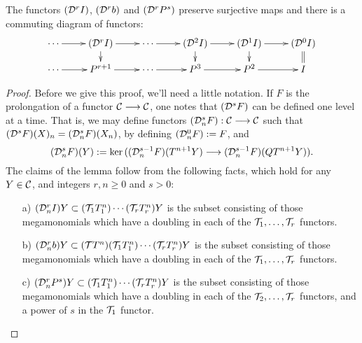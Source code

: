 \documentclass[10pt]{article}
\newcommand{\caldup}[1]{\calD^{\smash{#1}}}
\newcommand{\caldupdown}[2]{\calD^{\smash{#1}}_{\smash{#2}}}
\newcommand{\Comm}{\calC}
\begin{document}
\begin{convergence}
%
\begin{lem}\label{towerWithPowers}
The functors $(\caldup{r}I)$, $(\caldup{r}b)$ and $(\caldup{r}P^{s})$ preserve surjective maps and there is a commuting diagram of functors:
\[\xymatrix@R=4mm{
\cdots 
\ar[r]
&%
(\caldup{r}I)
\ar[r]
\ar[d]
&%
\cdots \ar[r]
&%
(\caldup{2}I)
\ar[r]
\ar[d]
&%
(\caldup{1}I)
\ar[r]
\ar[d]&%
(\caldup{0}I)
\ar@{=}[d]
\\%
\cdots
\ar[r]
&%
P^{r+1}
\ar[r]
&%
\cdots 
\ar[r]&%
P^3
\ar[r]
&P^2
\ar[r]
&%
I%
}\]
\end{lem}
\begin{proof}
Before we give this proof, we'll need a little notation.
If $F$ is the prolongation of a functor $\Comm\to\Comm$, one notes that $(\caldup{s}F)$ can be defined one level at a time. That is,  we may define functors $(\caldupdown{s}{n}F):\Comm\to\Comm$ such that $(\caldup{s}F)(X)_n=(\caldupdown{s}{n}F)(X_n)$, by defining $(\caldupdown{0}{n}F):=F$, and
\[(\caldupdown{s}{n}F)(Y):=\ker((\caldupdown{s-1}{n}F)(T^{n+1}Y)\to (\caldupdown{s-1}{n}F)(QT^{n+1}Y)).\]
The claims of the lemma follow from the following facts, which hold for any $Y\in\Comm$, and integers $r,n\geq0$ and $s>0$:
\begin{enumerate}
\squishlist
\setlength{\parindent}{.25in}
\item[a)] $(\caldupdown{r}{n}I)Y\subset (\calT_1T^n_1)\cdots (\calT_rT^n_r)Y$ is the subset consisting of those mega\-monomials which have a doubling in each of the $\mathcal{T}_1,\ldots,\mathcal{T}_r$ functors.
\item[b)] $(\caldupdown{r}{n}b)Y\subset (\calT T^n)(\calT_1T^n_1)\cdots (\calT_rT^n_r)Y$ is the subset consisting of those mega\-monomials which have a doubling in each of the $\mathcal{T}_1,\ldots,\mathcal{T}_r$ functors.
\item[c)] $(\caldupdown{r}{n}P^{s})Y\subset (\calT_1T^n_1)\cdots (\calT_rT^n_r)Y$ is the subset consisting of those mega\-monomials which have a doubling in each of the $\mathcal{T}_2,\ldots,\mathcal{T}_r$ functors, and a power of $s$ in the $\mathcal{T}_1$ functor.

\end{enumerate}
\end{proof}
\end{convergence}
\end{document}

